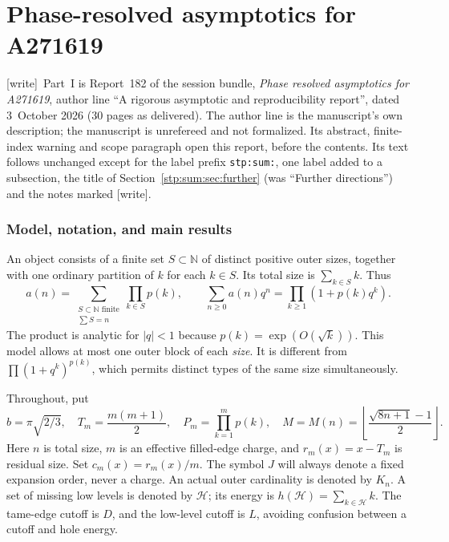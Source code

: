 \documentclass[11pt]{article}
\theoremstyle{remark}\newtheorem{remark}[theorem]{Remark}
\newcommand{\N}{\mathbb N}
\newcommand{\cH}{\mathcal H}
\newcommand{\wtag}{\textup{[write]}}
\begin{document}
\part{Phase-resolved asymptotics for A271619}\label{stp:sum:part}

\wtag\ Part~I is Report~182 of the session bundle, \emph{Phase resolved
asymptotics for A271619}, author line ``A rigorous asymptotic and
reproducibility report'', dated 3~October 2026 (30 pages as delivered). The
author line is the manuscript's own description; the manuscript is
unrefereed and not formalized. Its abstract, finite-index warning and scope
paragraph open this report, before the contents. Its text follows unchanged
except for the label prefix \texttt{stp:sum:}, one label added to a
subsection, the title of Section~\ref{stp:sum:sec:further} (was ``Further
directions'') and the notes marked \wtag.

\section{Model, notation, and main results}
\label{stp:sum:sec:main}
An object consists of a finite set $S\subset\N$ of distinct positive outer sizes, together with one ordinary partition of $k$ for each $k\in S$. Its total size is $\sum_{k\in S}k$. Thus
\begin{equation}\label{stp:sum:eq:model}
 a(n)=\sum_{\substack{S\subset\N\text{ finite}\\\sum S=n}}\prod_{k\in S}p(k),
 \qquad \sum_{n\ge0}a(n)q^n=\prod_{k\ge1}(1+p(k)q^k).
\end{equation}
The product is analytic for $|q|<1$ because $p(k)=\exp(O(\sqrt k))$. This model allows at most one outer block of each \emph{size}. It is different from $\prod(1+q^k)^{p(k)}$, which permits distinct types of the same size simultaneously.

Throughout, put
\begin{equation}\label{stp:sum:eq:notation}
 b=\pi\sqrt{2/3},\quad T_m=\frac{m(m+1)}2,\quad
 P_m=\prod_{k=1}^m p(k),\quad
 M=M(n)=\left\lfloor\frac{\sqrt{8n+1}-1}{2}\right\rfloor.
\end{equation}
Here $n$ is total size, $m$ is an effective filled-edge charge, and $r_m(x)=x-T_m$ is residual size. Set $c_m(x)=r_m(x)/m$. The symbol $J$ will always denote a fixed expansion order, never a charge. An actual outer cardinality is denoted by $K_n$. A set of missing low levels is denoted by $\cH$; its energy is $h(\cH)=\sum_{k\in\cH}k$. The tame-edge cutoff is $D$, and the low-level cutoff is $L$, avoiding confusion between a cutoff and hole energy.
\end{document}
